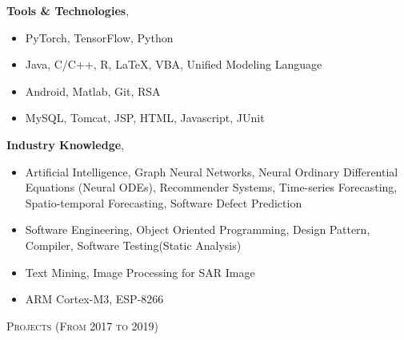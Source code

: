 \documentclass[10pt]{article}
\newenvironment{changemargin}[2]{
  \begin{list}{}{
    \setlength{\topsep}{0pt}
    \setlength{\leftmargin}{#1}
    \setlength{\rightmargin}{#2}
    \setlength{\listparindent}{\parindent}
    \setlength{\itemindent}{\parindent}
    \setlength{\parsep}{\parskip}
  }
  \item[]}{\end{list}
}
\newcommand{\lineover}{
	\begin{changemargin}{-0.05in}{-0.05in}
		\vspace*{-8pt}
		\hrulefill \\
		\vspace*{-2pt}
	\end{changemargin}
}
\newcommand{\header}[1]{
	\begin{changemargin}{-0.5in}{-0.5in}
		\scshape{#1}\\
  	\lineover
	\end{changemargin}
}
\newcommand{\labdescription}[1]{
	\begin{changemargin}{0.15in}{0.15in}
    \smallskip
		{#1}
    \medskip
	\end{changemargin}
}
\newcommand{\labtitle}[3]{
	\textbf{#1}, \emph{#2} \hfill \emph{#3}\\
}
\newenvironment{body} {
	\vspace*{-16pt}
	\begin{changemargin}{-0.25in}{-0.5in}
  }
	{\end{changemargin}
}
\begin{document}
\begin{body}
	\vspace{14pt}
  	\labtitle{Tools \& Technologies}{}{}
  \labdescription {
  	\begin{itemize} \itemsep -0pt  %
      \item PyTorch, TensorFlow, Python
      \item Java, C/C++, R, LaTeX, VBA, Unified Modeling Language
      \item Android, Matlab, Git, RSA
      \item MySQL, Tomcat, JSP, HTML, Javascript, JUnit
  	\end{itemize}
  }
  	\labtitle{Industry Knowledge}{}{}
  \labdescription {
  	\begin{itemize} \itemsep -0pt  %
      \item Artificial Intelligence, Graph Neural Networks, Neural Ordinary Differential Equations (Neural ODEs), Recommender Systems, Time-series Forecasting, Spatio-temporal Forecasting, Software Defect Prediction
      \item Software Engineering, Object Oriented Programming, Design Pattern, Compiler, Software Testing(Static Analysis)
      \item Text Mining, Image Processing for SAR Image
      \item ARM Cortex-M3, ESP-8266
  	\end{itemize}
  }

\end{body}

\medskip


\header{Projects (From 2017 to 2019)}
\end{document}
